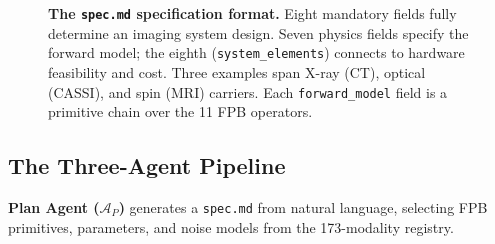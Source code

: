 \documentclass[11pt,a4paper]{article}
\newcommand{\Agent}{\mathcal{A}}
\begin{document}
\begin{figure}[htbp]
\caption{\textbf{The \texttt{spec.md} specification format.}  Eight mandatory fields fully determine an imaging system design.  Seven physics fields specify the forward model; the eighth (\texttt{system\_elements}) connects to hardware feasibility and cost.  Three examples span X-ray (CT), optical (CASSI), and spin (MRI) carriers.  Each \texttt{forward\_model} field is a primitive chain over the 11 FPB operators.}
\label{fig:specmd}
\end{figure}

\subsection{The Three-Agent Pipeline}
\label{sec:pipeline}

\textbf{Plan Agent ($\Agent_P$)} generates a \texttt{spec.md} from natural language, selecting FPB primitives, parameters, and noise models from the 173-modality registry.
\end{document}
